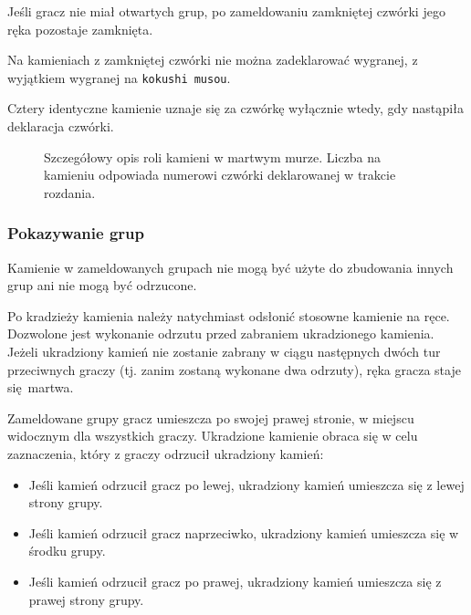 Jeśli gracz nie miał otwartych grup, po zameldowaniu zamkniętej czwórki jego
ręka pozostaje zamknięta.

Na kamieniach z zamkniętej czwórki nie można zadeklarować wygranej, z wyjątkiem
wygranej na \texttt{kokushi musou}.

Cztery identyczne kamienie uznaje się za czwórkę wyłącznie wtedy, gdy nastąpiła
deklaracja czwórki.

\begin{figure}[h]
    \centering
    
    \caption{Szczegółowy opis roli kamieni w martwym murze. Liczba na kamieniu
    odpowiada numerowi czwórki deklarowanej w trakcie rozdania.}
    \label{fig:dead-wall}
\end{figure}

\subsubsection{Pokazywanie grup}
Kamienie w zameldowanych grupach nie mogą być użyte do zbudowania innych grup
ani nie mogą być odrzucone.

Po kradzieży kamienia należy natychmiast odsłonić stosowne kamienie na ręce.
Dozwolone jest wykonanie odrzutu przed zabraniem ukradzionego kamienia.
Jeżeli ukradziony kamień nie zostanie zabrany w ciągu następnych dwóch tur
przeciwnych graczy (tj. zanim zostaną wykonane dwa odrzuty), ręka gracza staje
się martwa.

Zameldowane grupy gracz umieszcza po swojej prawej stronie, w miejscu widocznym
dla wszystkich graczy.
Ukradzione kamienie obraca się w celu zaznaczenia, który z graczy odrzucił
ukradziony kamień:
\begin{itemize}
    \item Jeśli kamień odrzucił gracz po lewej, ukradziony kamień umieszcza się
        z lewej strony grupy.
        \begin{center}
        \end{center}
    \item Jeśli kamień odrzucił gracz naprzeciwko, ukradziony kamień umieszcza
        się w środku grupy.
        \begin{center}
        \end{center}
    \item Jeśli kamień odrzucił gracz po prawej, ukradziony kamień umieszcza się
        z prawej strony grupy.
        \begin{center}
        \end{center}
\end{itemize}

